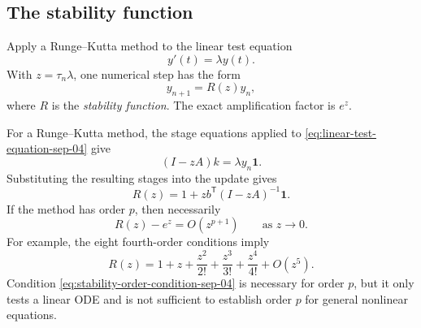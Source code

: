 \subsection{The stability function}

Apply a Runge--Kutta method to the linear test equation
\begin{equation}\label{eq:linear-test-equation-sep-04}
  y'(t)=\lambda y(t).
\end{equation}
With \(z=\tau_n\lambda\), one numerical step has the form
\begin{equation}\label{eq:stability-update-sep-04}
  y_{n+1}=R(z)y_n,
\end{equation}
where \(R\) is the \emph{stability function}. The exact amplification
factor is \(e^z\).

For a Runge--Kutta method, the stage equations applied to
\eqref{eq:linear-test-equation-sep-04} give
\[
  (I-zA)k=\lambda y_n\mathbf{1}.
\]
Substituting the resulting stages into the update gives
\begin{equation}\label{eq:rk-stability-function-sep-04}
  R(z)=1+z b^{\mathsf T}(I-zA)^{-1}\mathbf{1}.
\end{equation}
If the method has order \(p\), then necessarily
\begin{equation}\label{eq:stability-order-condition-sep-04}
  R(z)-e^z=O(z^{p+1})
  \qquad\text{as }z\to0.
\end{equation}
For example, the eight fourth-order conditions imply
\[
  R(z)=1+z+\frac{z^2}{2!}+\frac{z^3}{3!}
       +\frac{z^4}{4!}+O(z^5).
\]
Condition \eqref{eq:stability-order-condition-sep-04} is necessary for
order \(p\), but it only tests a linear ODE and is not sufficient to
establish order \(p\) for general nonlinear equations.
